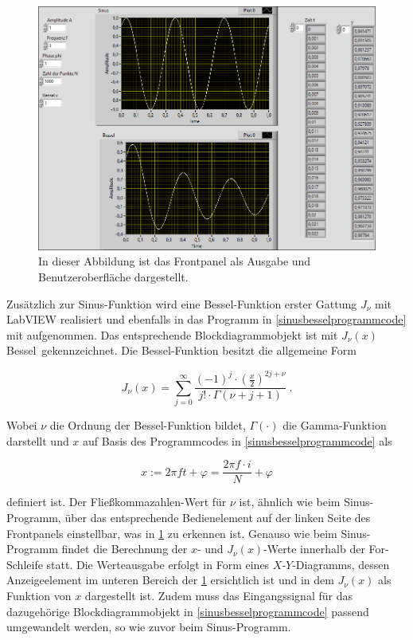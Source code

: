 \documentclass[
a4paper,
12pt,
pagesize,
ngerman
]{scrartcl}
\begin{document}
	\begin{figure}[H]
		\centering
		\includegraphics[width=1.0\textwidth]{EIRE2018Dateien/Tag1/sinusbessel-bilder/SinusBesselp}
		\caption{In dieser Abbildung ist das Frontpanel als Ausgabe und Benutzeroberfläche dargestellt.}
		\label{sinusbesselausgabe}
	\end{figure}

	\noindent Zusätzlich zur Sinus-Funktion wird eine Bessel-Funktion erster Gattung $J_{\nu}$ mit LabVIEW realisiert und ebenfalls in das Programm in \cref{sinusbesselprogrammcode} mit aufgenommen. Das entsprechende Blockdiagrammobjekt ist mit \glqq $J_{\nu}(x)$ Bessel\grqq\ gekennzeichnet. Die Bessel-Funktion besitzt die allgemeine Form
	
	\begin{equation}
	J_{\nu}(x) = \sum_{j=0}^{\infty}\frac{(-1)^j \cdot \left( \frac{x}{2}\right) ^{2j+\nu}}{j! \cdot \Gamma(\nu + j + 1)} \ .
	\end{equation}
	
	\noindent Wobei $\nu$ die Ordnung der Bessel-Funktion bildet, $\Gamma(\cdot)$ die Gamma-Funktion darstellt und $x$ auf Basis des Programmcodes in \cref{sinusbesselprogrammcode} als 
	
	\begin{equation}
	x := 2\pi f t + \varphi = \frac{2\pi f \cdot i}{N} + \varphi
	\end{equation}
	
	\noindent definiert ist. Der Fließkommazahlen-Wert für $\nu$ ist, ähnlich wie beim Sinus-Programm, über das entsprechende Bedienelement auf der linken Seite des Frontpanels einstellbar, was in \cref{sinusbesselausgabe} zu erkennen ist. Genauso wie beim Sinus-Programm findet die Berechnung der $x$- und $J_{\nu}(x)$-Werte innerhalb der For-Schleife statt. Die Werteausgabe erfolgt in Form eines $X$-$Y$-Diagramms, dessen Anzeigeelement im unteren Bereich der \cref{sinusbesselausgabe} ersichtlich ist und in dem $J_{\nu}(x)$ als Funktion von $x$ dargestellt ist. Zudem muss das Eingangssignal für das dazugehörige Blockdiagrammobjekt in \cref{sinusbesselprogrammcode} passend umgewandelt werden, so wie zuvor beim Sinus-Programm. 
\end{document}
